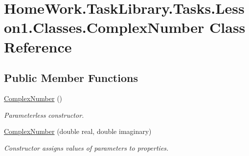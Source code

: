 \hypertarget{class_home_work_1_1_task_library_1_1_tasks_1_1_lesson1_1_1_classes_1_1_complex_number}{}\section{Home\+Work.\+Task\+Library.\+Tasks.\+Lesson1.\+Classes.\+Complex\+Number Class Reference}
\label{class_home_work_1_1_task_library_1_1_tasks_1_1_lesson1_1_1_classes_1_1_complex_number}
\subsection*{Public Member Functions}
\begin{DoxyCompactItemize}
\item 
\mbox{\hyperlink{class_home_work_1_1_task_library_1_1_tasks_1_1_lesson1_1_1_classes_1_1_complex_number_adef77baa9560e845dfe4bf13ee5ee5da}{Complex\+Number}} ()
\begin{DoxyCompactList}\small\item\em Parameterless constructor. \end{DoxyCompactList}\item 
\mbox{\hyperlink{class_home_work_1_1_task_library_1_1_tasks_1_1_lesson1_1_1_classes_1_1_complex_number_a17dbc33718ccc4e0edceba47dd44a84c}{Complex\+Number}} (double real, double imaginary)
\begin{DoxyCompactList}\small\item\em Constructor assigns values of parameters to properties. \end{DoxyCompactList}\end{DoxyCompactItemize}
